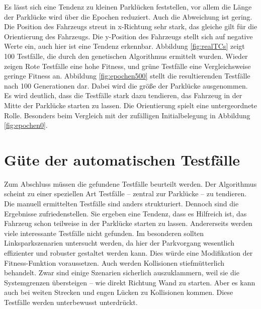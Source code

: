 \documentclass[12pt,a4paper]{article}
\begin{document}
Es lässt sich eine Tendenz zu kleinen Parklücken feststellen, vor allem die Länge der Parklücke wird über die Epochen reduziert. Auch die Abweichung ist gering. Die Position des Fahrzeugs streut in x-Richtung sehr stark, das gleiche gilt für die Orientierung des Fahrzeugs. Die y-Position des Fahrzeugs stellt sich auf negative Werte ein, auch hier ist eine Tendenz erkennbar. Abbildung \ref{fig:realTCs} zeigt 100 Testfälle, die durch den genetischen Algorithmus ermittelt wurden. Wieder zeigen Rote Testfälle eine hohe Fitness, und grüne Testfälle eine Vergleichsweise geringe Fitness an. Abbildung \ref{fig:epochen500} stellt die resultierenden Testfälle nach 100 Generationen dar. Dabei wird die größe der Parklücke ausgenommen. Es wird deutlich, dass die Testfälle stark dazu tendieren, das Fahrzeug in der Mitte der Parklücke starten zu lassen. Die Orientierung spielt eine untergeordnete Rolle. Besonders beim Vergleich mit der zufälligen Initialbelegung in Abbildung \ref{fig:epochen0}.

\section{Güte der automatischen Testfälle}
Zum Abschluss müssen die gefundene Testfälle beurteilt werden. Der Algorithmus scheint zu einer speziellen Art Testfälle -- zentral zur Parklücke -- zu tendieren. Die manuell ermittelten Testfälle sind anders strukturiert. Dennoch sind die Ergebnisse zufriedenstellen. Sie ergeben eine Tendenz, dass es Hilfreich ist, das Fahrzeug schon teilweise in der Parklücke starten zu lassen. Andererseits werden viele interessante Testfälle nicht gefunden. Im besonderen sollten Linksparkszenarien untersucht werden, da hier der Parkvorgang wesentlich effizienter und robuster gestaltet werden kann. Dies würde eine Modifikation der Fitness-Funktion voraussetzen. Auch werden Kollisionen stiefmütterlich behandelt. Zwar sind einige Szenarien sicherlich auszuklammern, weil sie die Systemgrenzen übersteigen -- wie direkt Richtung Wand zu starten. Aber es kann auch bei weiten Strecken und engen Lücken zu Kollisionen kommen. Diese Testfälle werden unterbewusst unterdrückt.
\end{document}
